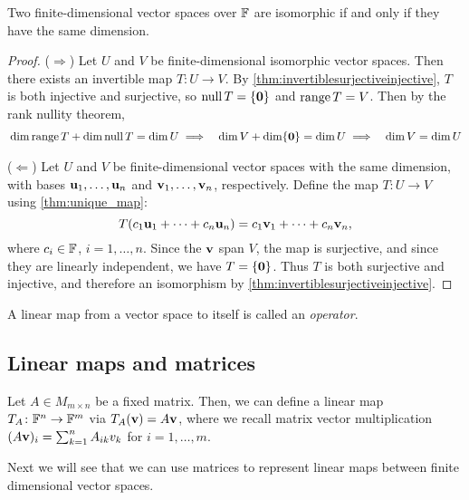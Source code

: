 \documentclass{article}
\begin{document}
\begin{theorem}
Two finite-dimensional vector spaces over ${\mathbb{F}}$ are isomorphic if and only if they have the same dimension.
\end{theorem}
\begin{proof}
($\Rightarrow$) Let $U$ and $V$ be finite-dimensional isomorphic vector spaces. Then there exists an invertible map $T: U \to V$. By \cref{thm:invertiblesurjectiveinjective}, $T$ is both injective and surjective, so $\operatorname{null} T = \{ {\mathbf{0}} \}$ and $\operatorname{range} T = V$. Then by the rank nullity theorem, 
\begin{align*}
    & \dim \operatorname{range} T + \dim \operatorname{null} T = \dim U 
     \implies &\dim V + \dim \{ {\mathbf{0}} \} = \dim U
    & \implies &\dim V = \dim U
\end{align*}

($\Leftarrow$) Let $U$ and $V$ be finite-dimensional vector spaces with the same dimension, with bases ${\mathbf{u}}_1, \ldots, {\mathbf{u}}_n$ and ${\mathbf{v}}_1, \ldots, {\mathbf{v}}_n$, respectively. Define the map $T:U \to V$ using \cref{thm:unique_map}:
$$ T(c_1 {\mathbf{u}}_1 + \cdots + c_n {\mathbf{u}}_n) =  c_1 {\mathbf{v}}_1 + \cdots + c_n {\mathbf{v}}_n,$$
where $c_i \in {\mathbb{F}}$, $i=1,\ldots,n$. Since the ${\mathbf{v}}$ span $V$, the map is surjective, and since they are linearly independent, we have $\null T = \{ \zerovec \}$. Thus $T$ is both surjective and injective, and therefore an isomorphism by \cref{thm:invertiblesurjectiveinjective}.
\end{proof}

\begin{definition}
A linear map from a vector space to itself is called an \emph{operator}.
\end{definition}


\subsection{Linear maps and matrices}
\begin{example}
Let $A\in M_{m\times n}$ be a fixed matrix. Then, we can define a linear map $T_A \colon {\mathbb{F}}^n \to {\mathbb{F}}^m$ via $T_A({\mathbf{v}}) = A {\mathbf{v}}$, where we recall matrix vector multiplication $(A{\mathbf{v}})_i = \sum_{k=1}^n A_{ik}v_k$ for $i=1, \ldots, m$.
\end{example}

Next we will see that we can use matrices to represent linear maps between finite dimensional vector spaces. 
\end{document}
